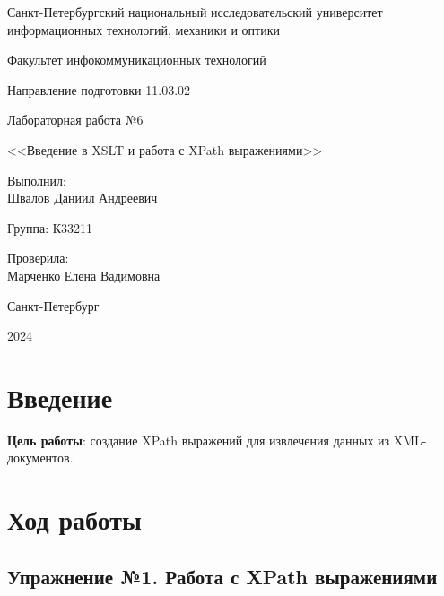 \documentclass[a4paper, 14pt]{extarticle}
\begin{document}
\begin{titlepage}
  \vspace{0pt plus2fill}
  \noindent

  \vspace{0pt plus6fill}
  \begin{center}
    Санкт-Петербургский национальный исследовательский университет
    информационных технологий, механики и оптики

    \vspace{0pt plus3fill}

    Факультет инфокоммуникационных технологий

    Направление подготовки 11.03.02

    \vspace{0pt plus2fill}

    Лабораторная работа №6

    <<Введение в XSLT и работа с XPath выражениями>>

  \end{center}

  \vspace{0pt plus6fill}
  \begin{flushright}
    Выполнил: \\
    Швалов Даниил Андреевич

    Группа: К33211

    Проверила: \\
    Марченко Елена Вадимовна
  \end{flushright}

  \vspace{0pt plus5fill}
  \begin{center}
    Санкт-Петербург

    2024
  \end{center}
\end{titlepage}

\section{Введение}

\textbf{Цель работы}: создание XPath выражений для извлечения данных из
XML-документов.

\section{Ход работы}

\subsection*{Упражнение №1. Работа с XPath выражениями}
\end{document}
